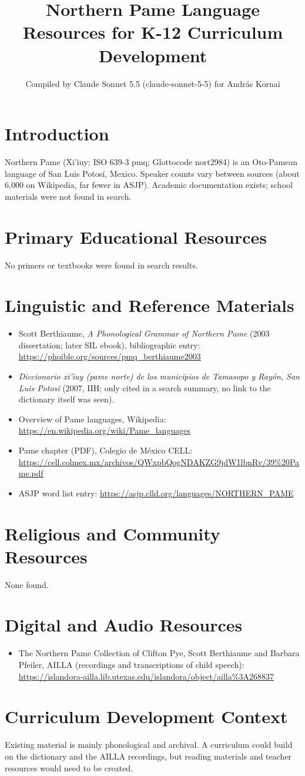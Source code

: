 \documentclass[12pt]{article}
\title{Northern Pame Language Resources for K-12 Curriculum Development}
\author{Compiled by Claude Sonnet 5.5 (claude-sonnet-5-5) for Andr\'as Kornai}
\date{}
\begin{document}
\maketitle

\section{Introduction}
Northern Pame (Xi'iuy; ISO 639-3 pmq; Glottocode nort2984) is an Oto-Pamean language of San Luis Potosí, Mexico. Speaker counts vary between sources (about 6,000 on Wikipedia, far fewer in ASJP). Academic documentation exists; school materials were not found in search.

\section{Primary Educational Resources}
No primers or textbooks were found in search results.

\section{Linguistic and Reference Materials}
\begin{itemize}
\item Scott Berthiaume, \emph{A Phonological Grammar of Northern Pame} (2003 dissertation; later SIL ebook), bibliographic entry: \url{https://phoible.org/sources/pmq_berthiaume2003}
\item \emph{Diccionario xi'iuy (pame norte) de los municipios de Tamasopo y Rayón, San Luis Potosí} (2007, IIH; only cited in a search summary, no link to the dictionary itself was seen).
\item Overview of Pame languages, Wikipedia: \url{https://en.wikipedia.org/wiki/Pame_languages}
\item Pame chapter (PDF), Colegio de México CELL: \url{https://cell.colmex.mx/archivos/QWxpbQogNDAKZG9jdW1lbnRv/39%20Pame.pdf}
\item ASJP word list entry: \url{https://asjp.clld.org/languages/NORTHERN_PAME}
\end{itemize}

\section{Religious and Community Resources}
None found.

\section{Digital and Audio Resources}
\begin{itemize}
\item The Northern Pame Collection of Clifton Pye, Scott Berthiaume and Barbara Pfeiler, AILLA (recordings and transcriptions of child speech): \url{https://islandora-ailla.lib.utexas.edu/islandora/object/ailla%3A268837}
\end{itemize}

\section{Curriculum Development Context}
Existing material is mainly phonological and archival. A curriculum could build on the dictionary and the AILLA recordings, but reading materials and teacher resources would need to be created.
\end{document}
